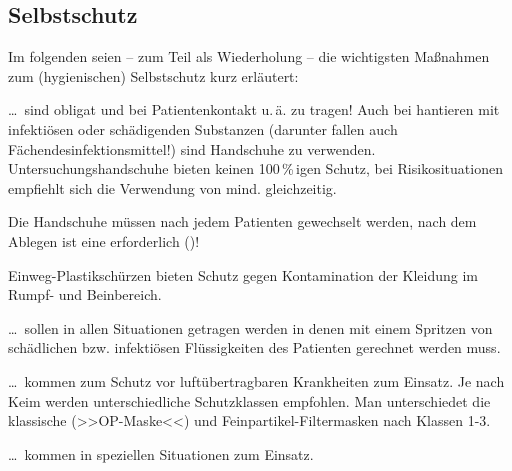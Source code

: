 



\subsection{Selbstschutz}

Im folgenden seien -- zum Teil als Wiederholung -- die wichtigsten Maßnahmen
zum (hygienischen) Selbstschutz kurz erläutert:


{

\begin{compactdesc}
  \item [Untersuchungshandschuhe] \ldots\ sind obligat und  bei
  Patientenkontakt u.\,ä. zu tragen! Auch bei hantieren mit infektiösen
  oder schädigenden Substanzen (darunter fallen auch
  Fächendesinfektionsmittel!) sind Handschuhe zu verwenden.
  Untersuchungshandschuhe bieten keinen 100\,\%\,igen Schutz, bei
  Risikosituationen empfiehlt sich die Verwendung von mind. 
  gleichzeitig. 
  
  Die Handschuhe müssen nach jedem Patienten gewechselt werden, nach dem
  Ablegen ist eine  erforderlich
  ()!
  \item [Schürzen] Einweg-Plastikschürzen bieten Schutz gegen Kontamination der
  Kleidung im Rumpf- und Beinbereich. 
  \item [Schutzbrillen] \ldots\ sollen in allen Situationen getragen werden in
  denen mit einem Spritzen von schädlichen bzw. infektiösen Flüssigkeiten des
  Patienten gerechnet werden muss. 
  \item [Atemmasken] \ldots\ kommen zum Schutz vor luftübertragbaren
  Krankheiten zum Einsatz. Je nach Keim werden unterschiedliche Schutzklassen
  empfohlen. Man unterschiedet die klassische 
  (>>OP-Maske<<) und Feinpartikel-Filtermasken nach  Klassen 1-3.
  \item [Schutzanzüge] \ldots\ kommen in speziellen Situationen zum
  Einsatz.
\end{compactdesc}

}{

}{}{}{}


